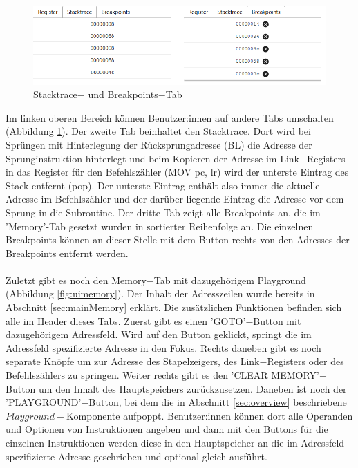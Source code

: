 \documentclass[a4paper, 11pt, onecolumn]{article}
\begin{document}
\begin{figure}[!htb]
\centering
\includegraphics[width=1\textwidth]{data/stackBreak}
\caption{Stacktrace$-$ und Breakpoints$-$Tab}
\label{fig:stackbreak}
\end{figure}

Im linken oberen Bereich können Benutzer:innen auf andere Tabs umschalten (Abbildung \ref{fig:stackbreak}). Der zweite Tab beinhaltet den Stacktrace. Dort wird bei Sprüngen mit Hinterlegung der Rücksprungadresse (BL) die Adresse der Sprunginstruktion hinterlegt und beim Kopieren der Adresse im Link$-$Registers in das Register für den Befehlszähler (MOV pc, lr) wird der unterste Eintrag des Stack entfernt (pop). Der unterste Eintrag enthält also immer die aktuelle Adresse im Befehlszähler und der darüber liegende Eintrag die Adresse vor dem Sprung in die Subroutine. Der dritte Tab zeigt alle Breakpoints an, die im 'Memory'-Tab gesetzt wurden in sortierter Reihenfolge an. Die einzelnen Breakpoints können an dieser Stelle mit dem Button rechts von den Adresses der Breakpoints entfernt werden. \\ \\
Zuletzt gibt es noch den Memory$-$Tab mit dazugehörigem Playground (Abbildung \ref{fig:uimemory}). Der Inhalt der Adresszeilen wurde bereits in Abschnitt \ref{sec:mainMemory} erklärt. Die zusätzlichen Funktionen befinden sich alle im Header dieses Tabs. Zuerst gibt es einen 'GOTO'$-$Button mit dazugehörigem Adressfeld. Wird auf den Button geklickt, springt die im Adressfeld spezifizierte Adresse in den Fokus. Rechts daneben gibt es noch separate Knöpfe um zur Adresse des Stapelzeigers, des Link$-$Registers oder des Befehlszählers zu springen. Weiter rechts gibt es den 'CLEAR MEMORY'$-$Button um den Inhalt des Hauptspeichers zurückzusetzen. Daneben ist noch der 'PLAYGROUND'$-$Button, bei dem die in Abschnitt \ref{sec:overview} beschriebene $Playground-$Komponente aufpoppt. Benutzer:innen können dort alle Operanden und Optionen von Instruktionen angeben und dann mit den Buttons für die einzelnen Instruktionen werden diese in den Hauptspeicher an die im Adressfeld spezifizierte Adresse geschrieben und optional gleich ausführt.\\
\end{document}
